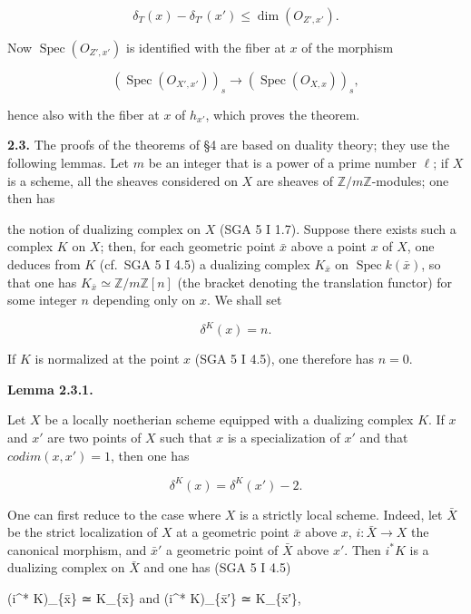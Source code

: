 \documentclass[
  11pt,
  a4paper,
]{book}
\newenvironment{Shaded}{}{}
\newcommand{\NormalTok}[1]{#1}
\begin{document}
\[ \delta_{T}(x) - \delta_{T'}(x') \leqslant \dim(O_{Z',x'}). \]

Now \(\operatorname{Spec}(O_{Z',x'})\) is identified with the fiber at
\(x\) of the morphism

\[ (\operatorname{Spec}(O_{X',x'}))_{s} \to (\operatorname{Spec}(O_{X,x}))_{s}, \]

hence also with the fiber at \(x\) of \(h_{x'}\), which proves the
theorem.

\textbf{2.3.} The proofs of the theorems of §4 are based on duality
theory; they use the following lemmas. Let \(m\) be an integer that is a
power of a prime number \(\ell\); if \(X\) is a scheme, all the sheaves
considered on \(X\) are sheaves of \(\mathbb{Z}/m\mathbb{Z}\)-modules;
one then has

the notion of dualizing complex on \(X\) (SGA 5 I 1.7). Suppose there
exists such a complex \(K\) on \(X\); then, for each geometric point
\(\bar{x}\) above a point \(x\) of \(X\), one deduces from \(K\)
(cf.~SGA 5 I 4.5) a dualizing complex \(K_{\bar{x}}\) on
\(\operatorname{Spec} k(\bar{x})\), so that one has
\(K_{\bar{x}} \simeq \mathbb{Z}/m\mathbb{Z}[n]\) (the bracket denoting
the translation functor) for some integer \(n\) depending only on \(x\).
We shall set

\[ \delta^{K}(x) = n. \]

If \(K\) is normalized at the point \(x\) (SGA 5 I 4.5), one therefore
has \(n = 0\).

\textbf{Lemma 2.3.1.}

Let \(X\) be a locally noetherian scheme equipped with a dualizing
complex \(K\). If \(x\) and \(x'\) are two points of \(X\) such that
\(x\) is a specialization of \(x'\) and that \(codim({x}, {x'}) = 1\),
then one has

\[ \delta^{K}(x) = \delta^{K}(x') - 2. \]

One can first reduce to the case where \(X\) is a strictly local scheme.
Indeed, let \(\bar{X}\) be the strict localization of \(X\) at a
geometric point \(\bar{x}\) above \(x\), \(i : \bar{X} \to X\) the
canonical morphism, and \(\bar{x}'\) a geometric point of \(\bar{X}\)
above \(x'\). Then \(i^{*} K\) is a dualizing complex on \(\bar{X}\) and
one has (SGA 5 I 4.5)

\begin{Shaded}
\begin{Highlighting}[]
\NormalTok{(i\^{}* K)\_\{x̄\} ≃ K\_\{x̄\} and (i\^{}* K)\_\{x̄′\} ≃ K\_\{x̄′\},}
\end{Highlighting}
\end{Shaded}
\end{document}
